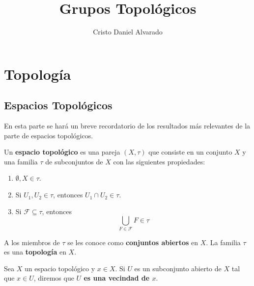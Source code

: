 \documentclass[12pt]{report}
\theoremstyle{largebreak}
\newcommand{\eul}[1]{\ensuremath{\mathscr{#1}}}
\begin{document}
    \title{Grupos Topológicos}
    \author{Cristo Daniel Alvarado}
    \maketitle

    \tableofcontents %

    
    \setcounter{chapter}{1}

    \chapter{Topología}
    
    \section{Espacios Topológicos}

    En esta parte se hará un breve recordatorio de los resultados más relevantes de la parte de espacios topológicos.

    \begin{mydef}
        Un \textbf{espacio topológico} es una pareja $(X,\tau)$ que consiste en un conjunto $X$ y una familia $\tau$ de subconjuntos de $X$ con las siguientes propiedades:
        \begin{enumerate}
            \item $\emptyset, X\in \tau$.
            \item Si $U_1,U_2\in \tau$, entonces $U_1\cap U_2\in \tau$.
            \item Si $\eul{F}\subseteq \tau$, entonces
            \begin{equation*}
                \bigcup_{F\in \eul{F}}F\in\tau
            \end{equation*}
        \end{enumerate}
    \end{mydef}

    A los miembros de $\tau$ se les conoce como \textbf{conjuntos abiertos} en $X$. La familia $\tau$ es una \textbf{topología} en $X$.

    \begin{mydef}
        Sea $X$ un espacio topológico y $x\in X$. Si $U$ es un subconjunto abierto de $X$ tal que $x\in U$, diremos que \textbf{$U$ es una vecindad de $x$}.
    \end{mydef}
\end{document}
